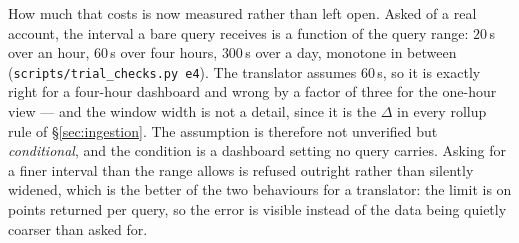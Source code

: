 \begin{remark}\label{rem:rollup-default-cost}
How much that costs is now measured rather than left open. Asked of a real account, the
interval a bare query receives is a function of the query range: $20$\,s over an hour,
$60$\,s over four hours, $300$\,s over a day, monotone in between
(\texttt{scripts\slash trial\_checks.py e4}). The translator assumes $60$\,s, so it is
exactly right for a four-hour dashboard and wrong by a factor of three for the one-hour
view --- and the window width is not a detail, since it is the $\Delta$ in every rollup
rule of \S\ref{sec:ingestion}. The assumption is therefore not unverified but
\emph{conditional}, and the condition is a dashboard setting no query carries. Asking for
a finer interval than the range allows is refused outright rather than silently widened,
which is the better of the two behaviours for a translator: the limit is on points
returned per query, so the error is visible instead of the data being quietly coarser
than asked for.
\end{remark}
